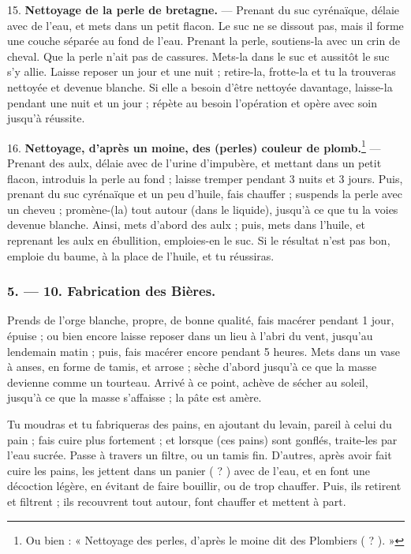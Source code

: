 \documentclass[a4paper, 11pt, oneside, polutonikogreek, french]{article}
\begin{document}
15. \textbf{Nettoyage de la perle de bretagne.} --- Prenant du suc cyrénaïque, délaie avec de l'eau, et mets dans un petit flacon. Le suc ne se dissout pas, mais il forme une couche séparée au fond de l'eau. Prenant la perle, soutiens-la avec un crin de cheval. Que la perle n'ait pas de cassures. Mets-la dans le suc et aussitôt le suc s'y allie. Laisse reposer un jour et une nuit ; retire-la, frotte-la et tu la trouveras nettoyée et devenue blanche. Si elle a besoin d'être nettoyée davantage, laisse-la pendant une nuit et un jour ; répète au besoin l'opération et opère avec soin jusqu'à réussite.

16. \textbf{Nettoyage, d'après un moine, des (perles) couleur de plomb.}\footnote{Ou bien : « Nettoyage des perles, d'après le moine dit des Plombiers ( ? ). »} --- Prenant des aulx, délaie avec de l'urine d'impubère, et mettant dans un petit flacon, introduis la perle au fond ; laisse tremper pendant 3 nuits et 3 jours. Puis, prenant du suc cyrénaïque et un peu d'huile, fais chauffer ; suspends la perle avec un cheveu ; promène-(la) tout autour (dans le liquide), jusqu'à ce que tu la voies devenue blanche. Ainsi, mets d'abord des aulx ; puis, mets dans l'huile, et reprenant les aulx en ébullition, emploies-en le suc. Si le résultat n'est pas bon, emploie du baume, à la place de l'huile, et tu réussiras.

\bigskip
\centerline{\EightStarTaper}
\centerline{\EightStarTaper\EightStarTaper}
\bigskip

\subsubsection{5. --- 10. Fabrication des Bières.}

Prends de l'orge blanche, propre, de bonne qualité, fais macérer pendant 1 jour, épuise ; ou bien encore laisse reposer dans un lieu à l'abri du vent, jusqu'au lendemain matin ; puis, fais macérer encore pendant 5 heures. Mets dans un vase à anses, en forme de tamis, et arrose ; sèche d'abord jusqu'à ce que la masse devienne comme un tourteau. Arrivé à ce point, achève de sécher au soleil, jusqu'à ce que la masse s'affaisse ; la pâte est amère.

Tu moudras et tu fabriqueras des pains, en ajoutant du levain, pareil à celui du pain ; fais cuire plus fortement ; et lorsque (ces pains) sont gonflés, traite-les par l'eau sucrée. Passe à travers un filtre, ou un tamis fin. D'autres, après avoir fait cuire les pains, les jettent dans un panier ( ? ) avec de l'eau, et en font une décoction légère, en évitant de faire bouillir, ou de trop chauffer. Puis, ils retirent et filtrent ; ils recouvrent tout autour, font chauffer et mettent à part.
\end{document}
